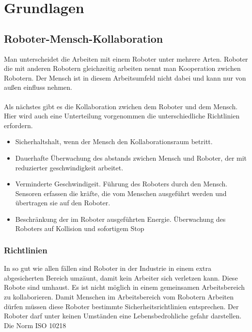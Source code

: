 \chapter{Grundlagen}

\section{Roboter-Mensch-Kollaboration}
\label{sec:roboter-mensch-kollaboration_gru}

Man unterscheidet die Arbeiten mit einem Roboter unter mehrere Arten.
Roboter die mit anderen Robotern gleichzeitig arbeiten nennt man Kooperation zwichen Robotern.
Der Mensch ist in diesem Arbeitsumfeld nicht dabei und kann nur von außen einfluss nehmen.
\\\\
Als nächstes gibt es die Kollaboration zwichen dem Roboter und dem Mensch. 
Hier wird auch eine Unterteilung vorgenommen die unterschiedliche Richtlinien erfordern.

\begin{itemize}
\item Sicherhaltshalt, wenn der Mensch den Kollaborationsraum betritt.
\item Dauerhafte Überwachung des abstands zwichen Mensch und Roboter, der mit reduzierter geschwindigkeit arbeitet.
\item Verminderte Geschwindigeit. Führung des Roboters durch den Mensch. Sensoren erfassen die kräfte, die vom Menschen ausgeführt werden und übertragen sie auf den Roboter.
\item Beschränkung der im Roboter ausgeführten Energie. Überwachung des Roboters auf Kollision und sofortigem Stop
\end{itemize}

\subsection{Richtlinien}
\label{kol_richtlinien_gru}

In so gut wie allen fällen sind Roboter in der Industrie in einem extra abgesicherten Bereich umzäunt, damit kein Arbeiter sich verletzen kann. Diese Robote sind umhaust. Es ist nicht möglich in einem gemeinsamen Arbeitsbereich zu kollaborieren. 
Damit Menschen im Arbeitsbereich vom Robotern Arbeiten dürfen müssen diese Roboter bestimmte Sicherheitsrichtlinien entsprechen.
Der Roboter darf unter keinen Umständen eine Lebensbedrohliche gefahr darstellen. Die Norm ISO 10218

